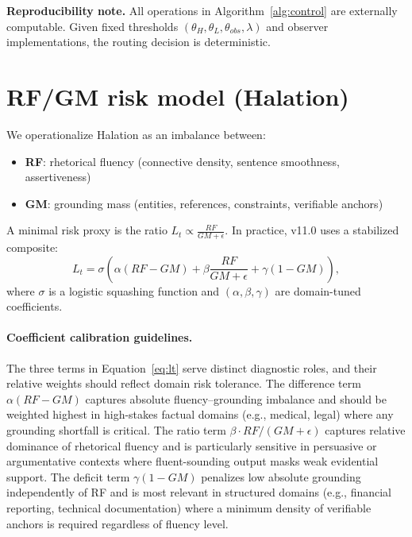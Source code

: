 \documentclass[11pt,a4paper]{article}
\begin{document}
\textbf{Reproducibility note.} All operations in Algorithm~\ref{alg:control} are externally
computable. Given fixed thresholds $(\theta_H, \theta_L, \theta_{obs}, \lambda)$ and observer
implementations, the routing decision is deterministic.

\section{RF/GM risk model (Halation)}

We operationalize Halation as an imbalance between:
\begin{itemize}
\item \textbf{RF}: rhetorical fluency (connective density, sentence smoothness, assertiveness)
\item \textbf{GM}: grounding mass (entities, references, constraints, verifiable anchors)
\end{itemize}

A minimal risk proxy is the ratio $L_t \propto \frac{RF}{GM+\epsilon}$. In practice, v11.0
uses a stabilized composite:
\begin{equation}
L_t = \sigma\!\left(\alpha(RF - GM) + \beta\frac{RF}{GM + \epsilon} + \gamma(1 - GM)\right),
\label{eq:lt}
\end{equation}
where $\sigma$ is a logistic squashing function and $(\alpha, \beta, \gamma)$ are domain-tuned
coefficients.

\paragraph{Coefficient calibration guidelines.}
The three terms in Equation~\ref{eq:lt} serve distinct diagnostic roles, and their relative
weights should reflect domain risk tolerance.
The difference term $\alpha(RF - GM)$ captures absolute fluency--grounding imbalance and
should be weighted highest in high-stakes factual domains (e.g., medical, legal) where
any grounding shortfall is critical.
The ratio term $\beta \cdot RF/(GM+\epsilon)$ captures relative dominance of rhetorical
fluency and is particularly sensitive in persuasive or argumentative contexts where
fluent-sounding output masks weak evidential support.
The deficit term $\gamma(1-GM)$ penalizes low absolute grounding independently of RF
and is most relevant in structured domains (e.g., financial reporting, technical
documentation) where a minimum density of verifiable anchors is required regardless
of fluency level.
\end{document}

